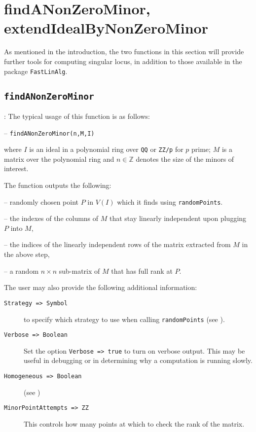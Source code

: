 \documentclass[11pt]{amsart}
\theoremstyle{definition}
\begin{document}
\section{findANonZeroMinor, extendIdealByNonZeroMinor}

As mentioned in the introduction, the two functions in this section will provide further tools for computing singular locus, in addition to those available in the package {\tt FastLinAlg}. 

	\subsection{\tt findANonZeroMinor}\label{findANonZeroMinor}: The typical usage of this function is as follows: 
	
	\vspace{1em}
	-- {\tt findANonZeroMinor(n,M,I)} 
	
	\vspace{1em}
	\noindent where $I$ is an ideal
	in a polynomial ring over {\tt QQ} or {\tt ZZ/p} for $p$ prime; $M$ is a matrix
	over the polynomial ring and $n\in \mathbb{Z}$ denotes the size of the minors of interest.
	
	
	The function outputs the following:
	
	-- randomly chosen point $P$ in $V(I)$ which it finds using {\tt randomPoints}.
	
	-- the indexes of the columns of $M$ that stay linearly independent upon plugging $P$ into $M$, 
	
	-- the indices of the linearly independent rows of the matrix extracted from $M$ in the above step, 
	
	-- a random $n\times n$ sub-matrix of $M$ that has full rank at $P$.
	
The user may also provide the following additional information: 

\begin{description}
	\item[\tt Strategy => Symbol] to specify which strategy to use when calling {\tt randomPoints} (see ).
	
	\item[\tt Verbose => Boolean]
		 Set the option {\tt Verbose => true} to turn on verbose output.  This may be useful in debugging or in determining why a computation is running slowly.
		 
	\item[\tt Homogeneous => Boolean] (see )
	
	\item[\tt MinorPointAttempts => ZZ] 
		This controls how many points at which to check the rank of the matrix.
\end{description}
\end{document}
